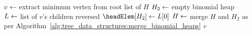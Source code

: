 
\DontPrintSemicolon
\SetAlgoNoLine
\BlankLine
$v \leftarrow$ extract minimum vertex from root list of $H$\;
$H_2 \leftarrow$ empty binomial heap\;
$L \leftarrow$ list of $v$'s children reversed\;
$\headElem[H_2] \assign L[0]$\;
$H \leftarrow$ merge $H$ and $H_2$ as per Algorithm~\ref{alg:tree_data_structures:merge_binomial_heaps}\;
\Return $v$\;
